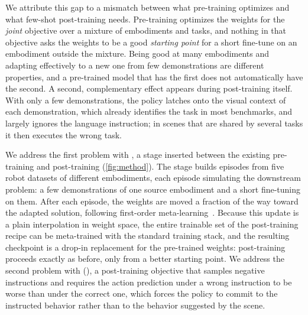We attribute this gap to a mismatch between what pre-training optimizes and what few-shot post-training needs.
Pre-training optimizes the weights for the \emph{joint} objective over a mixture of embodiments and tasks, and nothing in that objective asks the weights to be a good \emph{starting point} for a short fine-tune on an embodiment outside the mixture.
Being good at many embodiments and adapting effectively to a new one from few demonstrations are different properties, and a pre-trained model that has the first does not automatically have the second.
A second, complementary effect appears during post-training itself.
With only a few demonstrations, the policy latches onto the visual context of each demonstration, which already identifies the task in most benchmarks, and largely ignores the language instruction; in scenes that are shared by several tasks it then executes the wrong task.

We address the first problem with \Method, a stage inserted between the existing pre-training and post-training (\cref{fig:method}).
The stage builds episodes from five robot datasets of different embodiments, each episode simulating the downstream problem: a few demonstrations of one source embodiment and a short fine-tuning on them.
After each episode, the weights are moved a fraction of the way toward the adapted solution, following first-order meta-learning~\cite{nichol2018reptile}.
Because this update is a plain interpolation in weight space, the entire trainable set of the post-training recipe can be meta-trained with the standard training stack, and the resulting checkpoint is a drop-in replacement for the pre-trained weights: post-training proceeds exactly as before, only from a better starting point.
We address the second problem with \Rpl (\RPL), a post-training objective that samples negative instructions and requires the action prediction under a wrong instruction to be worse than under the correct one, which forces the policy to commit to the instructed behavior rather than to the behavior suggested by the scene.

